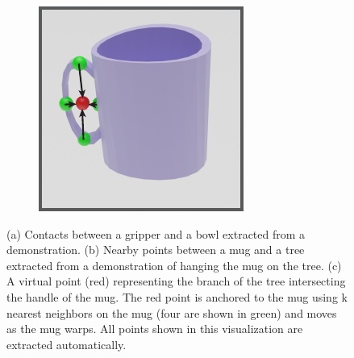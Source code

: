 \documentclass{article}
\begin{document}
\begin{figure}
\begin{subfigure}[b]{0.22\textwidth}
        \caption{}
    \end{subfigure}
    \hspace{0.05\textwidth}
    \begin{subfigure}[b]{0.22\textwidth}
        \centering
        \includegraphics[width=\textwidth]{figures/contact_fig2.pdf}
        \caption{}
    \end{subfigure}
    \caption{(a) Contacts between a gripper and a bowl extracted from a demonstration. (b) Nearby points between a mug and a tree extracted from a demonstration of hanging the mug on the tree. (c) A virtual point (red) representing the branch of the tree intersecting the handle of the mug. The red point is anchored to the mug using k nearest neighbors on the mug (four are shown in green) and moves as the mug warps. All points shown in this visualization are extracted automatically.}
    \label{fig:contacts}
\end{figure}
\end{document}

